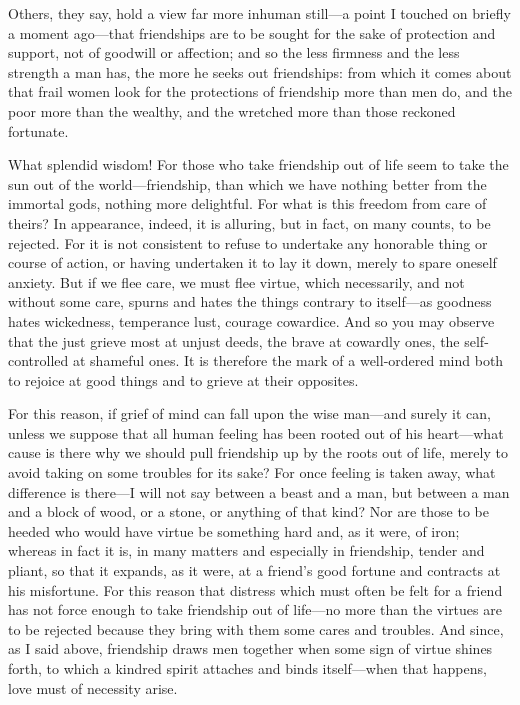  Others, they say, hold a view far more inhuman still—a point I touched on briefly a moment ago—that friendships are to be sought for the sake of protection and support, not of goodwill or affection; and so the less firmness and the less strength a man has, the more he seeks out friendships: from which it comes about that frail women look for the protections of friendship more than men do, and the poor more than the wealthy, and the wretched more than those reckoned fortunate.

 What splendid wisdom! For those who take friendship out of life seem to take the sun out of the world—friendship, than which we have nothing better from the immortal gods, nothing more delightful. For what is this freedom from care of theirs? In appearance, indeed, it is alluring, but in fact, on many counts, to be rejected. For it is not consistent to refuse to undertake any honorable thing or course of action, or having undertaken it to lay it down, merely to spare oneself anxiety. But if we flee care, we must flee virtue, which necessarily, and not without some care, spurns and hates the things contrary to itself—as goodness hates wickedness, temperance lust, courage cowardice. And so you may observe that the just grieve most at unjust deeds, the brave at cowardly ones, the self-controlled at shameful ones. It is therefore the mark of a well-ordered mind both to rejoice at good things and to grieve at their opposites.

 For this reason, if grief of mind can fall upon the wise man—and surely it can, unless we suppose that all human feeling has been rooted out of his heart—what cause is there why we should pull friendship up by the roots out of life, merely to avoid taking on some troubles for its sake? For once feeling is taken away, what difference is there—I will not say between a beast and a man, but between a man and a block of wood, or a stone, or anything of that kind? Nor are those to be heeded who would have virtue be something hard and, as it were, of iron; whereas in fact it is, in many matters and especially in friendship, tender and pliant, so that it expands, as it were, at a friend's good fortune and contracts at his misfortune. For this reason that distress which must often be felt for a friend has not force enough to take friendship out of life—no more than the virtues are to be rejected because they bring with them some cares and troubles. And since, as I said above, friendship draws men together when some sign of virtue shines forth, to which a kindred spirit attaches and binds itself—when that happens, love must of necessity arise.

